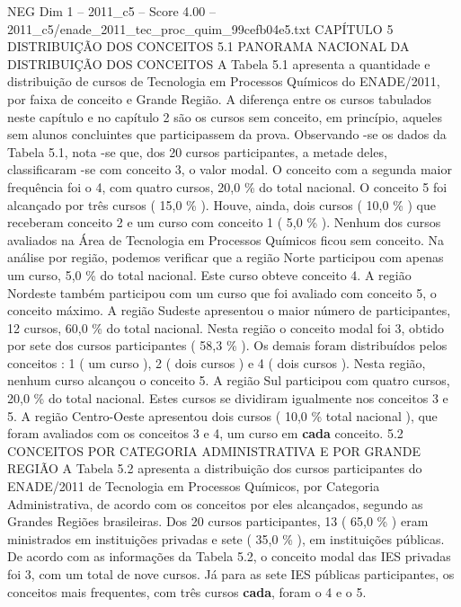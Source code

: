 \begin{textsample}{NEG Dim 1 – 2011\_c5 – Score 4.00 – 2011\_c5/enade\_2011\_tec\_proc\_quim\_99cefb04e5.txt}  \label{ex:f1_neg_319}
CAPÍTULO 5 DISTRIBUIÇÃO DOS CONCEITOS 5.1 PANORAMA NACIONAL DA DISTRIBUIÇÃO DOS CONCEITOS A Tabela 5.1 apresenta a quantidade e distribuição de cursos de Tecnologia em Processos Químicos do ENADE/2011, por faixa de conceito e Grande Região.
A diferença entre os cursos tabulados neste capítulo e no capítulo 2 são os cursos sem conceito, em princípio, aqueles sem alunos concluintes que participassem da prova.
Observando -se os dados da Tabela 5.1, nota -se que, dos 20 cursos participantes, a metade deles, classificaram -se com conceito 3, o valor modal.
O conceito com a segunda maior frequência foi o 4, com quatro cursos, 20,0 \% do total nacional.
O conceito 5 foi alcançado por três cursos ( 15,0 \% ).
Houve, ainda, dois cursos ( 10,0 \% ) que receberam conceito 2 e um curso com conceito 1 ( 5,0 \% ).
Nenhum dos cursos avaliados na Área de Tecnologia em Processos Químicos ficou sem conceito.
Na análise por região, podemos verificar que a região Norte participou com apenas um curso, 5,0 \% do total nacional.
Este curso obteve conceito 4.
A região Nordeste também participou com um curso que foi avaliado com conceito 5, o conceito máximo.
A região Sudeste apresentou o maior número de participantes, 12 cursos, 60,0 \% do total nacional.
Nesta região o conceito modal foi 3, obtido por sete dos cursos participantes ( 58,3 \% ).
Os demais foram distribuídos pelos conceitos : 1 ( um curso ), 2 ( dois cursos ) e 4 ( dois cursos ).
Nesta região, nenhum curso alcançou o conceito 5.
A região Sul participou com quatro cursos, 20,0 \% do total nacional.
Estes cursos se dividiram igualmente nos conceitos 3 e 5.
A região Centro-Oeste apresentou dois cursos ( 10,0 \% total nacional ), que foram avaliados com os conceitos 3 e 4, um curso em \textbf{cada} conceito. 5.2 CONCEITOS POR CATEGORIA ADMINISTRATIVA E POR GRANDE REGIÃO A Tabela 5.2 apresenta a distribuição dos cursos participantes do ENADE/2011 de Tecnologia em Processos Químicos, por Categoria Administrativa, de acordo com os conceitos por eles alcançados, segundo as Grandes Regiões brasileiras.
Dos 20 cursos participantes, 13 ( 65,0 \% ) eram ministrados em instituições privadas e sete ( 35,0 \% ), em instituições públicas.
De acordo com as informações da Tabela 5.2, o conceito modal das IES privadas foi 3, com um total de nove cursos.
Já para as sete IES públicas participantes, os conceitos mais frequentes, com três cursos \textbf{cada}, foram o 4 e o 5.

\end{textsample}
